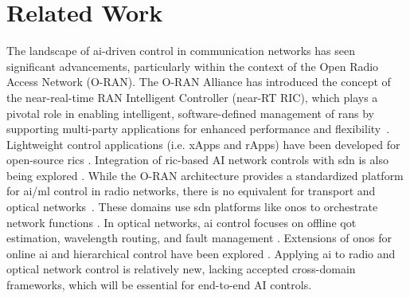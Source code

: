 \section{Related Work}
The landscape of \ac{ai}-driven control in communication networks has seen significant advancements, particularly within the context of the Open Radio Access Network (O-RAN). The O-RAN Alliance has introduced the concept of the near-real-time RAN Intelligent Controller (near-RT RIC), which plays a pivotal role in enabling intelligent, software-defined management of \acp{ran} by supporting multi-party applications for enhanced performance and flexibility~\cite{polese2023understanding}. Lightweight control applications (i.e. xApps and rApps) have been developed for open-source \acp{ric} \cite{lee2020hosting, xavier2023machine}. Integration of \ac{ric}-based AI network controls with \ac{sdn} is also being explored \cite{xavier2024cross}. While the O-RAN architecture provides a standardized platform for \ac{ai}/\ac{ml} control in radio networks, there is no equivalent for transport and optical networks~\cite{lee2020hosting}. These domains use \ac{sdn} platforms like \ac{onos} to orchestrate network functions \cite{akinrintoyo2023reconfigurable}. In optical networks, \ac{ai} control focuses on offline \ac{qot} estimation, wavelength routing, and fault management \cite{mata2018artificial}. Extensions of \ac{onos} for online \ac{ai} and hierarchical control have been explored \cite{morro2018automated}. Applying \ac{ai} to radio and optical network control is relatively new, lacking accepted cross-domain frameworks, which will be essential for end-to-end AI controls. 



